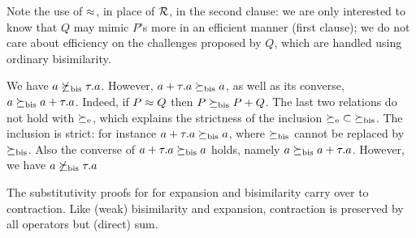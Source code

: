 Note the use of $\approx$, in place of ${\cal R}$, in the second clause:
we are only interested to know that $Q$ may  mimic $P$'s
more in an efficient manner (first clause); we do not care about
efficiency on the challenges proposed by $Q$, which are handled using ordinary
bisimilarity.

\begin{example}
\label{exa:contr}
We have %
 $ a \not  \mathrel{\succeq_{\rm{bis}}} \tau. a$. However,
$a+ \tau . a \mathrel{\succeq_{\rm{bis}}} a$, as well as its converse, 
$  a \mathrel{\succeq_{\rm{bis}}} a +
\tau . a $. Indeed, if $P \approx Q$ then 
$  P  \mathrel{\succeq_{\rm{bis}}} P +Q$. The last two relations do not hold with 
$\mathrel{\succeq_{\rm{e}}}$, which explains the strictness of the inclusion
 ${\mathrel{\succeq_{\rm{e}}}} \subset {\mathrel{\succeq_{\rm{bis}}}}$. 
The inclusion is strict: for instance
$a+ \tau . a \mathrel{\succeq_{\rm{bis}}} a$, where $\mathrel{\succeq_{\rm{bis}}}$ cannot be replaced by
$\mathrel{\succeq_{\rm{bis}}}$. Also the converse of  $a+ \tau . a \mathrel{\succeq_{\rm{bis}}} a$ holds, namely
$  a \mathrel{\succeq_{\rm{bis}}} a +
\tau . a $. However, we have %
$ a \not  \mathrel{\succeq_{\rm{bis}}} \tau. a$
\end{example} 

The substitutivity proofs for for expansion and bisimilarity carry
over to contraction. Like (weak) bisimilarity and expansion, contraction is
preserved by all operators but (direct) sum.

